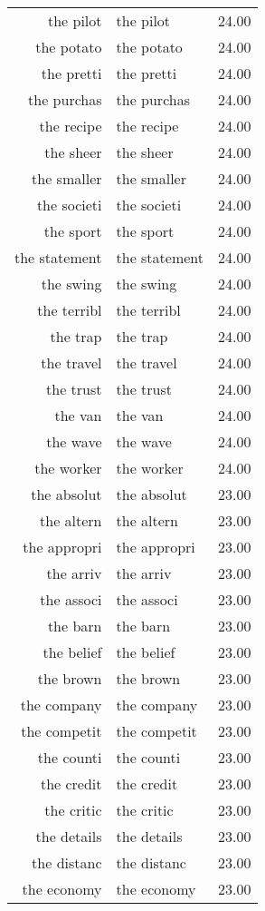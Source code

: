 \begin{table}[ht]
\begin{tabular}{rlr}
  the pilot & the pilot & 24.00 \\ 
  the potato & the potato & 24.00 \\ 
  the pretti & the pretti & 24.00 \\ 
  the purchas & the purchas & 24.00 \\ 
  the recipe & the recipe & 24.00 \\ 
  the sheer & the sheer & 24.00 \\ 
  the smaller & the smaller & 24.00 \\ 
  the societi & the societi & 24.00 \\ 
  the sport & the sport & 24.00 \\ 
  the statement & the statement & 24.00 \\ 
  the swing & the swing & 24.00 \\ 
  the terribl & the terribl & 24.00 \\ 
  the trap & the trap & 24.00 \\ 
  the travel & the travel & 24.00 \\ 
  the trust & the trust & 24.00 \\ 
  the van & the van & 24.00 \\ 
  the wave & the wave & 24.00 \\ 
  the worker & the worker & 24.00 \\ 
  the absolut & the absolut & 23.00 \\ 
  the altern & the altern & 23.00 \\ 
  the appropri & the appropri & 23.00 \\ 
  the arriv & the arriv & 23.00 \\ 
  the associ & the associ & 23.00 \\ 
  the barn & the barn & 23.00 \\ 
  the belief & the belief & 23.00 \\ 
  the brown & the brown & 23.00 \\ 
  the company & the company & 23.00 \\ 
  the competit & the competit & 23.00 \\ 
  the counti & the counti & 23.00 \\ 
  the credit & the credit & 23.00 \\ 
  the critic & the critic & 23.00 \\ 
  the details & the details & 23.00 \\ 
  the distanc & the distanc & 23.00 \\ 
  the economy & the economy & 23.00 \\ 

\end{tabular}
\end{table}
